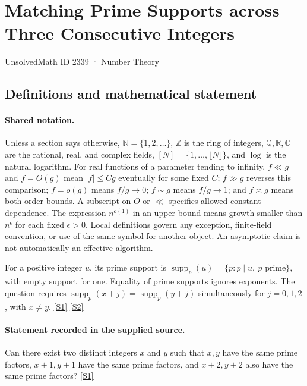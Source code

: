 \documentclass[11pt,a4paper]{article}
\newcommand{\N}{\mathbb{N}}
\newcommand{\Z}{\mathbb{Z}}
\newcommand{\Q}{\mathbb{Q}}
\newcommand{\R}{\mathbb{R}}
\newcommand{\C}{\mathbb{C}}
\newcommand{\sref}[2]{\hyperlink{source:#1:#2}{[S#2]}}
\begin{document}

\setcounter{section}{2338}

\section{Matching Prime Supports across Three Consecutive Integers}\label{2339}

{\small\sffamily UnsolvedMath ID 2339 · Number Theory}

\subsection{Definitions and mathematical statement}

\paragraph{Shared notation.}Unless a section says otherwise, $\N=\{1,2,\ldots\}$,
$\Z$ is the ring of integers, $\Q,\R,\C$ are the rational, real, and complex
fields, $[N]=\{1,\ldots,\lfloor N\rfloor\}$, and $\log$ is the natural
logarithm. For real functions of a parameter tending to infinity,
$f\ll g$ and $f=O(g)$ mean $|f|\leq Cg$ eventually for some fixed $C$;
$f\gg g$ reverses this comparison; $f=o(g)$ means $f/g\to0$;
$f\sim g$ means $f/g\to1$; and $f\asymp g$ means both order bounds.
A subscript on $O$ or $\ll$ specifies allowed constant dependence.
The expression $n^{o(1)}$ in an upper bound means growth smaller than
$n^\epsilon$ for each fixed $\epsilon>0$. Local definitions govern any
exception, finite-field convention, or use of the same symbol for another
object. An asymptotic claim is not automatically an effective algorithm.



For a positive integer $u$, its prime support is $\operatorname{supp}_p(u)=\{p:p\mid u,\ p\text{ prime}\}$, with empty support for one. Equality of prime supports ignores exponents. The question requires $\operatorname{supp}_p(x+j)=\operatorname{supp}_p(y+j)$ simultaneously for $j=0,1,2$, with $x\ne y$. \sref{2339}{1} \sref{2339}{2}

\paragraph{Statement recorded in the supplied source.}
Can there exist two distinct integers $x$ and $y$ such that $x,y$ have the same prime factors, $x+1,y+1$ have the same prime factors, and $x+2,y+2$ also have the same prime factors? \sref{2339}{1}
\end{document}
